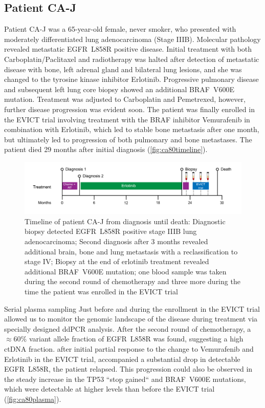 \subsection{Patient CA-J}
\label{cascade-sec:CA80}

Patient CA-J was a 65-year-old female, never smoker, who presented with moderately differentiated lung  adenocarcinoma (Stage IIIB). Molecular pathology revealed metastatic EGFR~L858R positive disease. Initial treatment with both Carboplatin/Paclitaxel and radiotherapy was halted after detection of metastatic disease with bone, left adrenal gland and bilateral lung lesions, and she was changed to the tyrosine kinase inhibitor Erlotinib. Progressive pulmonary disease and subsequent left lung core biopsy showed an additional BRAF~V600E mutation. Treatment was adjusted to Carboplatin and Pemetrexed, however, further disease progression was evident soon. The patient was finally enrolled in the EVICT trial involving treatment with the BRAF inhibitor Vemurafenib in combination with Erlotinib, which led to stable bone metastasis after one month, but ultimately led to progression of both pulmonary and bone metastases. The patient died 29 months after  initial diagnosis (\autoref{fig:ca80timeline}).

\begin{figure}[ht]
\centering
\includegraphics[width=.99\linewidth]{Figures/CASCADE/CA80/CA-J_timeline}
\caption[Timeline of patient CA-J from diagnosis until death]{Timeline of patient CA-J from diagnosis until death: Diagnostic biopsy detected EGFR~L858R positive stage IIIB lung adenocarcinoma; Second diagnosis after 3 months revealed additional brain, bone and lung metastasis with a reclassification to stage IV; Biopsy at the end of erlotinib treatment revealed additional BRAF~V600E mutation; one blood sample was taken during the second round of chemotherapy and three more during the time the patient was enrolled in the EVICT trial} \label{fig:ca80timeline}
\end{figure}

Serial plasma sampling Just before and during the enrollment in the EVICT trial allowed us to monitor the genomic landscape of the disease during treatment via specially designed ddPCR analysis. After the second round of chemotherapy, a $\approx 60\%$ variant allele fraction of EGFR~L858R was found, suggesting a high ctDNA fraction.  after  initial partial response to the change to Vemurafenib and Erlotinib in the EVICT trial, accompanied  a substantial drop in detectable EGFR~L858R, the patient relapsed. This progression could also be observed in the steady increase in the TP53 ``stop gained`` and BRAF~V600E mutations, which were detectable at higher levels than before the EVICT trial (\autoref{fig:ca80plasma}).

